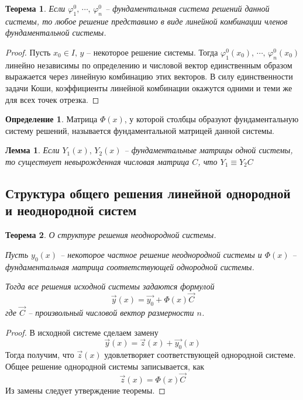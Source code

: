 \documentclass[a4paper,12pt]{article}
\renewcommand{\phi}{\ensuremath{\varphi}}
\theoremstyle{plain}
\newtheorem{theorem}{Теорема}[section]
\newtheorem{lemma}{Лемма}[section]
\theoremstyle{definition}
\newtheorem{definition}{Определение}[section]
\theoremstyle{remark}
\begin{document}
\begin{theorem}
	Если $\phi_1^0,\,\cdots,\,\phi_n^0$ -- фундаментальная система решений данной системы, то любое решение представимо в виде линейной комбинации членов фундаментальной системы.
\end{theorem}

\begin{proof}
	Пусть $x_0 \in I,\, y$ -- некоторое решение системы. Тогда $\phi_1^0(x_0),\,\cdots,\,\phi_n^0(x_0)$ линейно независимы по определению и числовой вектор единственным образом выражается через линейную комбинацию этих векторов. В силу единственности задачи Коши, коэффициенты линейной комбинации окажутся одними и теми же для всех точек отрезка.
\end{proof}

\begin{definition}
	Матрица $\Phi(x)$, у которой столбцы образуют фундаментальную систему решений, называется фундаментальной матрицей данной системы.
\end{definition}

\begin{lemma}
	Если $Y_1(x),\, Y_2(x)$ -- фундаментальные матрицы одной системы, то существует невырожденная числовая матрица $C$, что $Y_1 \equiv Y_2C$
\end{lemma}

\subsection{Структура общего решения линейной однородной и неоднородной систем}
\begin{theorem}
	О структуре решения неоднородной системы.

	Пусть $y_0(x)$ -- некоторое частное решение неоднородной системы и $\Phi(x)$ -- фундаментальная матрица соответствующей однородной системы.

	Тогда все решения исходной системы задаются формулой
	\[\vec{y}(x) = \vec{y_0} + \Phi(x)\vec{C}\]
	где $\vec{C}$ -- произвольный числовой вектор размерности $n$.
\end{theorem}

\begin{proof}
	В исходной системе сделаем замену
	\[\vec{y}(x) = \vec{z}(x) + \vec{y_0}(x)\]
	Тогда получим, что $\vec{z}(x)$ удовлетворяет соответствующей однородной системе. Общее решение однородной системы записывается, как
	\[\vec{z}(x) = \Phi(x)\vec{C}\]
	Из замены следует утверждение теоремы.
\end{proof}
\end{document}
